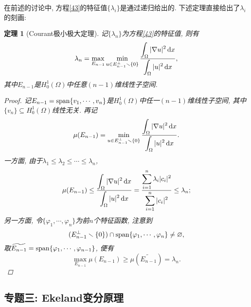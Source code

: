 \documentclass[12pt,a4paper]{article}
\newtheorem{theorem}{定理}[section]
\begin{document}
在前述的讨论中, 方程\eqref{43}的特征值$\{\lambda_i\}$是通过递归给出的.
下述定理直接给出了$\lambda_i$的刻画:

\begin{theorem}[Courant极小极大定理]
    记$\{\lambda_n\}$为方程\eqref{43}的特征值, 则有 
    \begin{equation*}
        \lambda_n = \max_{E_{n - 1}}\min_{u \in E_{n - 1}^{\bot} \smallsetminus \{0\}}\frac{\displaystyle\int_{\Omega}|\nabla u|^2 \,{\rm d}x}{\displaystyle \int_{\Omega}|u|^2 \,{\rm d}x},
    \end{equation*}
    其中$E_{n - 1}$是$H_0^1(\Omega)$中任意$(n - 1)$维线性子空间.
    \begin{proof}
        记$E_{n - 1} = {\rm span}\{v_1, \cdots, v_n\}$是$H_0^1(\Omega)$中任一$(n - 1)$维线性子空间, 其中$\{v_n\} \subseteq H_0^1(\Omega)$线性无关.
        再记 
        \begin{equation*}
            \mu(E_{n - 1}) = \min_{u \in E_{n - 1}^{\bot} \smallsetminus \{0\}}\frac{\displaystyle\int_{\Omega}|\nabla u|^2 \,{\rm d}x}{\displaystyle \int_{\Omega}|u|^2 \,{\rm d}x}.
        \end{equation*}
        一方面, 由于$\lambda_1 \leq \lambda_2 \leq \cdots \leq \lambda_n$, 
        \begin{equation*}
            \mu(E_{n - 1}) \leq \frac{\displaystyle\int_{\Omega}|\nabla u|^2 \,{\rm d}x}{\displaystyle \int_{\Omega}|u|^2 \,{\rm d}x} = \frac{\displaystyle\sum_{i = 1}^n\lambda_i|c_i|^2}{\displaystyle\sum_{i = 1}^n|c_i|^2} \leq \lambda_n;
        \end{equation*}
        另一方面, 令$\{\varphi_1, \cdots, \varphi_n\}$为前$n$个特征函数, 注意到 
        \begin{equation*}
            (E_{n - 1}^{\bot} \smallsetminus \{0\}) \cap {\rm span}\{\varphi_1, \cdots, \varphi_n\} \neq \varnothing,
        \end{equation*}
        取$\widetilde{E_{n - 1}} = {\rm span}\{\varphi_1, \cdots, \varphi_{n - 1}\}$, 便有 
        \begin{equation*}
            \max_{E_{n - 1}}\mu(E_{n - 1}) \geq \mu(\widetilde{E_{n - 1}}) = \lambda_n.
        \end{equation*}
    \end{proof}
\end{theorem}

\subsection{专题三: Ekeland变分原理}
\end{document}
